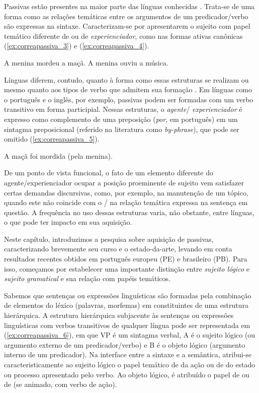 \documentclass[output=paper]{LSP/langsci}
\begin{document}
Passivas estão presentes na maior parte das línguas conhecidas \citep{keenandryer2007}. Trata-se de uma forma como as relações temáticas entre os argumentos de um predicador/verbo são expressas na sintaxe. Caracterizam-se por apresentarem o sujeito com papel temático diferente de  ou de \textit{experienciador}, como nas formas ativas canônicas (\ref{ex:correapassiva_3}) e (\ref{ex:correapassiva_4}).

\ea\label{ex:correapassiva_3} A menina mordeu a maçã.
\z
\ea\label{ex:correapassiva_4} A menina ouviu a música.
\z

Línguas diferem, contudo, quanto à forma como essas estruturas se realizam ou mesmo quanto aos tipos de verbo que admitem sua formação \citep{keenandryer2007}. Em línguas como o português e o inglês, por exemplo, passivas podem ser formadas com um verbo transitivo em forma participial. Nessas estruturas, o \textit{agente}/ \textit{experienciador} é expresso como complemento de uma preposição (\textit{por}, em português) em um sintagma preposicional (referido na literatura como \textit{by-phrase}), que pode ser omitido (\ref{ex:correapassiva_5}). 

\ea\label{ex:correapassiva_5} A maçã foi mordida (pela menina).
\z

De um ponto de vista funcional, o fato de um elemento diferente do agente\slash experienciador ocupar a posição proeminente de sujeito vem satisfazer certas demandas discursivas, como, por exemplo, na manutenção de um tópico, quando este não coincide com o / na relação temática expressa na sentença em questão.  A frequência no uso dessas estruturas varia, não obstante, entre línguas, o que pode ter impacto em sua aquisição. 

Neste capítulo, introduzimos a pesquisa sobre aquisição de passivas, caracterizando brevemente seu curso e o estado-da-arte, levando em conta resultados recentes obtidos em português europeu (PE) e brasileiro (PB). Para isso, começamos por estabelecer uma importante distinção entre \textit{sujeito lógico} e \textit{sujeito gramatical} e sua relação com papéis temáticos.

Sabemos que sentenças ou expressões linguísticas são formadas pela combinação de elementos do léxico (palavras, morfemas) em constituintes de uma estrutura hierárquica. A estrutura hierárquica subjacente às sentenças ou expressões linguísticas com verbos transitivos de qualquer língua pode ser representada em (\ref{ex:correapassiva_6}), em que VP é um sintagma verbal, A é o sujeito lógico (ou argumento externo de um predicador/verbo) e B é o objeto lógico (argumento interno de um predicador). Na interface entre a sintaxe e a semântica, atribui-se caracteristicamente ao sujeito lógico o papel temático de  da ação ou de  do estado ou processo apresentado pelo verbo. Ao objeto lógico, é atribuído o papel de  ou de  (se animado, com verbo de ação). 
\end{document}
